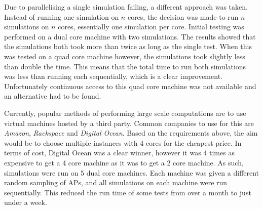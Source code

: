         Due to parallelising a single simulation failing, a different approach was taken. Instead of running one simulation on $n$ cores, the decision was made to run $n$ simulations on $n$ cores, essentially one simulation per core. Initial testing was performed on a dual core machine with two simulations. The results showed that the simulations both took more than twice as long as the single test. When this was tested on a quad core machine however, the simulations took slightly less than double the time. This means that the total time to run both simulations was less than running each sequentially, which is a clear improvement. Unfortunately continuous access to this quad core machine was not available and an alternative had to be found. 

        Currently, popular methods of performing large scale computations are to use virtual machines hosted by a third party. Common companies to use for this are \emph{Amazon}, \emph{Rackspace} and \emph{Digital Ocean}. Based on the requirements above, the aim would be to choose multiple instances with 4 cores for the cheapest price. In terms of cost, Digital Ocean was a clear winner, however it was 4 times as expensive to get a 4 core machine as it was to get a 2 core machine. As such, simulations were run on 5 dual core machines. Each machine was given a different random sampling of APs, and all simulations on each machine were run sequentially. This reduced the run time of some tests from over a month to just under a week. 



